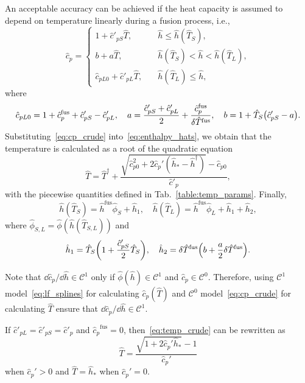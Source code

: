 \documentclass{article}
\newcommand{\fusion}[1]{{#1}^\mathrm{fus}}
\newcommand{\Hh}{\hat{h}}
\newcommand{\HT}{\hat{T}}
\newcommand{\Hc}{\hat{c}}
\newcommand{\Hphi}{\hat{\phi}}
\begin{document}
An acceptable accuracy can be achieved if the heat capacity is assumed
to depend on temperature linearly during a fusion process, i.e.,
\begin{equation}\label{eq:cp_crude}
	\Hc_p = \begin{cases}
        1 + \Hc'_{pS}\HT,         & \quad \Hh \leq \Hh(\HT_S), \\
        b + a\HT,                 & \quad \Hh(\HT_S) < \Hh < \Hh(\HT_L), \\
        \Hc_{pL0} + \Hc'_{pL}\HT, & \quad \Hh(\HT_L) \leq \Hh,
    \end{cases}
\end{equation}
where
\begin{equation*}
	\Hc_{pL0} = 1 + \fusion{\Hc_p} + \Hc'_{pS} - \Hc'_{pL}, \quad
	a = \frac{\Hc'_{pS} + \Hc'_{pL}}2 + \frac{\fusion{\Hc_p}}{\delta\fusion{\HT}}, \quad
	b = 1 + \HT_S\qty(\Hc'_{pS} - a).
\end{equation*}
Substituting~\eqref{eq:cp_crude} into~\eqref{eq:enthalpy_hats},
we obtain that the temperature is calculated as a root of the quadratic equation
\begin{equation}\label{eq:temp_crude}
	\HT = \HT^\dag + \frac{\sqrt{\Hc_{p0}^2 + 2\Hc_p'(\Hh_* - \Hh^\dag) } - \Hc_{p0}}{\Hc'_p},
\end{equation}
with the piecewise quantities defined in Tab.~\ref{table:temp_params}. Finally,
\begin{equation}\label{eq:enthalpySL_crude}
	\Hh(\HT_S) = \fusion{\Hh}\Hphi_S + \Hh_1, \quad \Hh(\HT_L) = \fusion{\Hh}\Hphi_L + \Hh_1 + \Hh_2,
\end{equation}
where \(\Hphi_{S,L} = \Hphi(\Hh(\HT_{S,L}))\) and
\begin{equation}\label{eq:enthalpy12_crude}
	\Hh_1 = \HT_S\qty(1 + \frac{\Hc'_{pS}}2\HT_S), \quad
	\Hh_2 = \delta\fusion{\HT}\qty(b + \frac{a}2\delta\fusion{\HT}).
\end{equation}

Note that \(\dd\Hc_p/\dd\Hh\in\mathcal{C}^1\)
only if \(\Hphi(\Hh)\in\mathcal{C}^1\) and \(\Hc_p\in\mathcal{C}^0\).
Therefore, using \(\mathcal{C}^1\) model~\eqref{eq:lf_splines} for calculating \(\Hc_p(\HT)\)
and \(\mathcal{C}^0\) model~\eqref{eq:cp_crude} for calculating \(\HT\)
ensure that \(\dd\Hc_p/\dd\Hh\in\mathcal{C}^1\).

If \(\Hc'_{pL} = \Hc'_{pS} = \Hc'_p\) and \(\fusion{\Hc_{p}} = 0\),
then~\eqref{eq:temp_crude} can be rewritten as
\begin{equation}\label{eq:temp_crude2}
	\HT = \frac{\sqrt{1+2\Hc_p'\Hh_*}-1}{\Hc_p'}
\end{equation}
when \(\Hc_p'>0\) and \(\HT = \Hh_*\) when \(\Hc_p'=0\).
\end{document}
